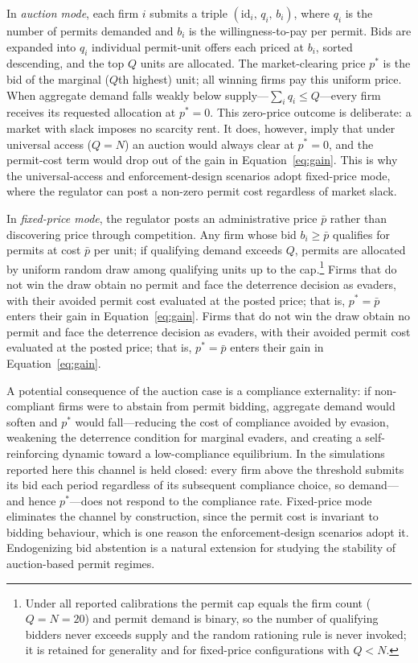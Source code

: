 In \emph{auction mode}, each firm $i$ submits a triple $(\text{id}_i,\, q_i,\, b_i)$, where $q_i$ is the number of permits demanded and $b_i$ is the willingness-to-pay per permit. Bids are expanded into $q_i$ individual permit-unit offers each priced at $b_i$, sorted descending, and the top $Q$ units are allocated. The market-clearing price $p^*$ is the bid of the marginal ($Q$th highest) unit; all winning firms pay this uniform price. When aggregate demand falls weakly below supply---$\sum_i q_i \leq Q$---every firm receives its requested allocation at $p^* = 0$. This zero-price outcome is deliberate: a market with slack imposes no scarcity rent. It does, however, imply that under universal access ($Q = N$) an auction would always clear at $p^* = 0$, and the permit-cost term would drop out of the gain in Equation~\eqref{eq:gain}. This is why the universal-access and enforcement-design scenarios adopt fixed-price mode, where the regulator can post a non-zero permit cost regardless of market slack.

In \emph{fixed-price mode}, the regulator posts an administrative price $\bar{p}$ rather than discovering price through competition. Any firm whose bid $b_i \geq \bar{p}$ qualifies for permits at cost $\bar{p}$ per unit; if qualifying demand exceeds $Q$, permits are allocated by uniform random draw among qualifying units up to the cap.\footnote{Under all reported calibrations the permit cap equals the firm count ($Q = N = 20$) and permit demand is binary, so the number of qualifying bidders never exceeds supply and the random rationing rule is never invoked; it is retained for generality and for fixed-price configurations with $Q < N$.} Firms that do not win the draw obtain no permit and face the deterrence decision as evaders, with their avoided permit cost evaluated at the posted price; that is, $p^* = \bar{p}$ enters their gain in Equation~\eqref{eq:gain}. Firms that do not win the draw obtain no permit and face the deterrence decision as evaders, with their avoided permit cost evaluated at the posted price; that is, $p^* = \bar{p}$ enters their gain in Equation~\eqref{eq:gain}.

A potential consequence of the auction case is a compliance externality: if non-compliant firms were to abstain from permit bidding, aggregate demand would soften and $p^*$ would fall---reducing the cost of compliance avoided by evasion, weakening the deterrence condition for marginal evaders, and creating a self-reinforcing dynamic toward a low-compliance equilibrium. In the simulations reported here this channel is held closed: every firm above the threshold submits its bid each period regardless of its subsequent compliance choice, so demand---and hence $p^*$---does not respond to the compliance rate. Fixed-price mode eliminates the channel by construction, since the permit cost is invariant to bidding behaviour, which is one reason the enforcement-design scenarios adopt it. Endogenizing bid abstention is a natural extension for studying the stability of auction-based permit regimes.

